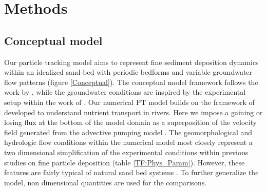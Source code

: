 \documentclass[draft,linenumbers]{agujournal2018}
\begin{document}
\section{Methods} \label{Methods}

\subsection{Conceptual model} \label{Conceptual_Model}

Our particle tracking model aims to represent fine sediment deposition dynamics within an idealized sand-bed with periodic bedforms and variable groundwater flow patterns (figure \ref{Conceptual}). The conceptual model framework follows the work by \citet{Elliott1997,Elliott1997b,Packman2000,Packman2000a}, while the groundwater conditions are inspired by the experimental setup within the work of \citet{Fox2014,Fox2018}. Our numerical PT model builds on the framework of \citet{Li2017} developed to understand nutrient transport in rivers. Here we impose a gaining or losing flux at the bottom of the model domain as a superposition of the velocity field generated from the advective pumping model \citep{Elliott1997}. The geomorphological and hydrologic flow conditions within the numerical model most closely represent a two dimensional simplification of the experimental conditions within previous studies on fine particle deposition \citep{Packman2000,Fox2014,Fox2018}(table \ref{TF:Phys_Param}). However, these features are fairly typical of natural sand bed systems \citep{Vanoni1974,Harvey2012,Worman2007,Hunken2007,Mutz2000,Mutz2003}. To further generalize the model, non dimensional quantities are used for the comparisons.
\end{document}
